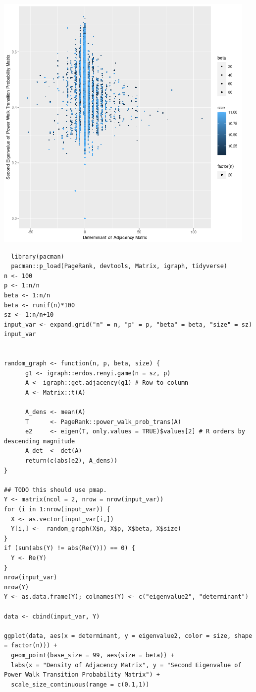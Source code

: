\documentclass[11pt]{article}
\begin{document}
\begin{center}
\includegraphics[width=.9\linewidth]{../Media/EigenValue_Determinant.png}
\end{center}


\begin{verbatim}
  library(pacman)
  pacman::p_load(PageRank, devtools, Matrix, igraph, tidyverse)
n <- 100
p <- 1:n/n
beta <- 1:n/n
beta <- runif(n)*100
sz <- 1:n/n+10
input_var <- expand.grid("n" = n, "p" = p, "beta" = beta, "size" = sz)
input_var


random_graph <- function(n, p, beta, size) {
      g1 <- igraph::erdos.renyi.game(n = sz, p)
      A <- igraph::get.adjacency(g1) # Row to column
      A <- Matrix::t(A)

      A_dens <- mean(A)
      T      <- PageRank::power_walk_prob_trans(A)
      e2     <- eigen(T, only.values = TRUE)$values[2] # R orders by descending magnitude
      A_det  <- det(A)
      return(c(abs(e2), A_dens))
}

## TODO this should use pmap.
Y <- matrix(ncol = 2, nrow = nrow(input_var))
for (i in 1:nrow(input_var)) {
  X <- as.vector(input_var[i,])
  Y[i,] <-  random_graph(X$n, X$p, X$beta, X$size)
}
if (sum(abs(Y) != abs(Re(Y))) == 0) {
  Y <- Re(Y)
}
nrow(input_var)
nrow(Y)
Y <- as.data.frame(Y); colnames(Y) <- c("eigenvalue2", "determinant")

data <- cbind(input_var, Y)

ggplot(data, aes(x = determinant, y = eigenvalue2, color = size, shape = factor(n))) +
  geom_point(base_size = 99, aes(size = beta)) +
  labs(x = "Density of Adjacency Matrix", y = "Second Eigenvalue of Power Walk Transition Probability Matrix") +
  scale_size_continuous(range = c(0.1,1))
\end{verbatim}
\end{document}

